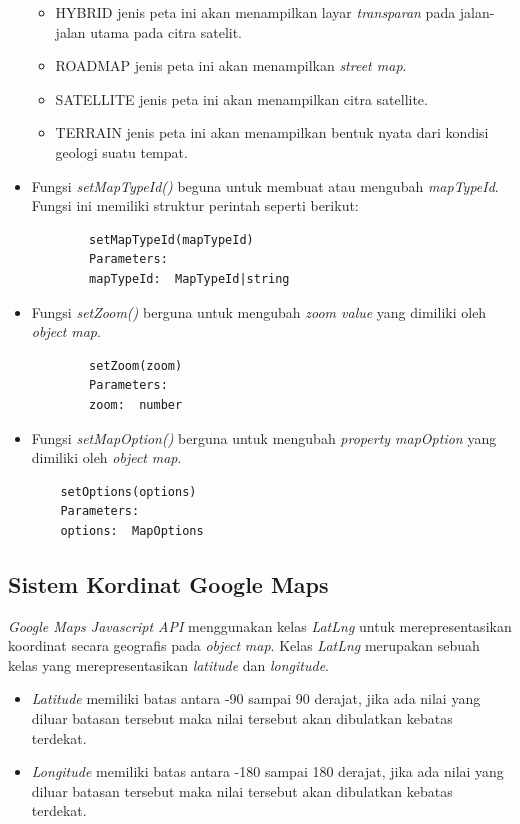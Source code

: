 \begin{itemize}
    \begin{itemize}
        \item HYBRID jenis peta ini akan menampilkan layar \textit{transparan} pada jalan-jalan utama pada citra satelit.
        \item ROADMAP jenis peta ini akan menampilkan \textit{street map}.
        \item SATELLITE jenis peta ini akan menampilkan citra satellite.
        \item TERRAIN jenis peta ini akan menampilkan bentuk nyata dari kondisi geologi suatu tempat.
    \end{itemize}
    \item Fungsi \textit{setMapTypeId()} beguna untuk membuat atau mengubah \textit{mapTypeId}. Fungsi ini memiliki struktur perintah seperti berikut:
    \begin{lstlisting}
        setMapTypeId(mapTypeId)
        Parameters: 
        mapTypeId:  MapTypeId|string
    \end{lstlisting}
    \item Fungsi \textit{setZoom()} berguna untuk mengubah \textit{zoom  value} yang dimiliki oleh \textit{object} \textit{map}.
    \begin{lstlisting}
        setZoom(zoom)
        Parameters: 
        zoom:  number
    \end{lstlisting}
    \item Fungsi \textit{setMapOption()} berguna untuk mengubah \textit{property mapOption} yang dimiliki oleh \textit{object} \textit{map}.
    \begin{lstlisting}
    setOptions(options)
    Parameters: 
    options:  MapOptions
    \end{lstlisting}
\end{itemize}

\subsection{Sistem Kordinat  Google Maps}
\textit{Google Maps Javascript API} menggunakan  kelas \textit{LatLng} untuk merepresentasikan koordinat secara geografis pada \textit{object} \textit{map}. Kelas \textit{LatLng} merupakan sebuah kelas yang merepresentasikan \textit{latitude} dan \textit{longitude}.
\begin{itemize}
    \item \textit{Latitude} memiliki batas antara -90 sampai 90 derajat, jika ada nilai yang diluar batasan tersebut maka nilai tersebut akan dibulatkan kebatas terdekat.
    \item \textit{Longitude} memiliki batas antara -180 sampai 180 derajat, jika ada nilai yang diluar batasan tersebut maka nilai tersebut akan dibulatkan kebatas terdekat. 
\end{itemize}

